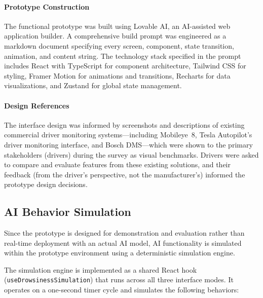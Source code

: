 \documentclass[sigconf]{acmart}
\begin{document}
\paragraph{Prototype Construction}
The functional prototype was built using Lovable AI, an AI-assisted web application builder. A comprehensive build prompt was engineered as a markdown document specifying every screen, component, state transition, animation, and content string. The technology stack specified in the prompt includes React with TypeScript for component architecture, Tailwind CSS for styling, Framer Motion for animations and transitions, Recharts for data visualizations, and Zustand for global state management.

\paragraph{Design References}
The interface design was informed by screenshots and descriptions of existing commercial driver monitoring systems---including Mobileye~8, Tesla Autopilot's driver monitoring interface, and Bosch DMS---which were shown to the primary stakeholders (drivers) during the survey as visual benchmarks. Drivers were asked to compare and evaluate features from these existing solutions, and their feedback (from the driver's perspective, not the manufacturer's) informed the prototype design decisions.

\subsection{AI Behavior Simulation}

Since the prototype is designed for demonstration and evaluation rather than real-time deployment with an actual AI model, AI functionality is simulated within the prototype environment using a deterministic simulation engine.

The simulation engine is implemented as a shared React hook (\texttt{useDrowsinessSimulation}) that runs across all three interface modes. It operates on a one-second timer cycle and simulates the following behaviors:
\end{document}
